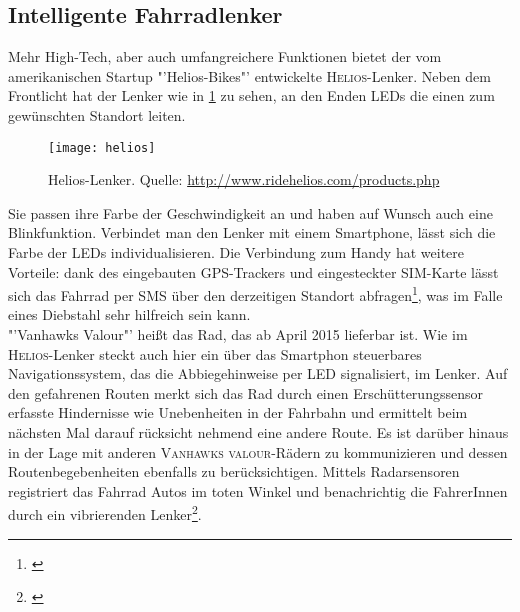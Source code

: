 \subsection{Intelligente Fahrradlenker}
Mehr High-Tech, aber auch umfangreichere Funktionen bietet der vom amerikanischen Startup "'Helios-Bikes"' entwickelte \textsc{Helios}-Lenker. Neben dem Frontlicht hat der Lenker wie in \ref{fig:helios} zu sehen, an den Enden \gls{LED}s die einen zum gewünschten Standort leiten. 
\begin{figure}[H]
    \centering
    \texttt{[image: helios]}
    \caption[Helios-Lenker]{Helios-Lenker.  Quelle: \url{http://www.ridehelios.com/products.php}} \label{fig:helios}
\end{figure}
Sie passen ihre Farbe der Geschwindigkeit an und haben auf Wunsch auch eine Blinkfunktion. Verbindet man den Lenker mit einem Smartphone, lässt sich die Farbe der \gls{LED}s individualisieren. Die Verbindung zum Handy hat weitere Vorteile: dank des eingebauten \gls{GPS}-Trackers und eingesteckter SIM-Karte lässt sich das Fahrrad per SMS über den derzeitigen Standort abfragen\footnote{\cite{Helios}}, was im Falle eines Diebstahl sehr hilfreich sein kann.\\
"'Vanhawks Valour"' heißt das Rad, das ab April 2015 lieferbar ist. Wie im \textsc{Helios}-Lenker steckt auch hier ein über das Smartphon steuerbares Navigationssystem, das die Abbiegehinweise per \gls{LED} signalisiert, im Lenker. Auf den gefahrenen Routen merkt sich das Rad durch einen Erschütterungssensor erfasste Hindernisse wie Unebenheiten in der Fahrbahn und ermittelt beim nächsten Mal darauf rücksicht nehmend eine andere Route. Es ist darüber hinaus in der Lage mit anderen \textsc{Vanhawks valour}-Rädern zu kommunizieren und dessen Routenbegebenheiten ebenfalls zu berücksichtigen. Mittels Radarsensoren registriert das Fahrrad Autos im toten Winkel und benachrichtig die FahrerInnen durch ein vibrierenden Lenker\footnote{\cite{vanhawks}}.
